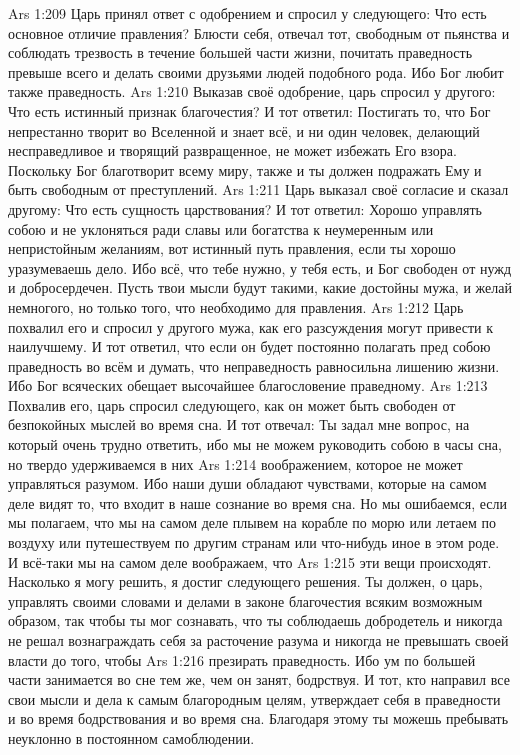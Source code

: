 \vs Ars 1:209
Царь принял ответ с одобрением и спросил у следующего: Что есть основное отличие правления? Блюсти себя, отвечал тот, свободным от пьянства и соблюдать трезвость в течение большей части жизни, почитать праведность превыше всего и делать своими друзьями людей подобного рода. Ибо Бог любит также праведность.
\vs Ars 1:210
Выказав своё одобрение, царь спросил у другого: Что есть истинный признак благочестия? И тот ответил: Постигать то, что Бог непрестанно творит во Вселенной и знает всё, и ни один человек, делающий несправедливое и творящий развращенное, не может избежать Его взора. Поскольку Бог благотворит всему миру, также и ты должен подражать Ему и быть свободным от преступлений.
\vs Ars 1:211
Царь выказал своё согласие и сказал другому: Что есть сущность царствования? И тот ответил: Хорошо управлять собою и не уклоняться ради славы или богатства к неумеренным или непристойным желаниям, вот истинный путь правления, если ты хорошо уразумеваешь дело. Ибо всё, что тебе нужно, у тебя есть, и Бог свободен от нужд и добросердечен. Пусть твои мысли будут такими, какие достойны мужа, и желай немногого, но только того, что необходимо для правления.
\vs Ars 1:212
Царь похвалил его и спросил у другого мужа, как его разсуждения могут привести к наилучшему. И тот ответил, что если он будет постоянно полагать пред собою праведность во всём и думать, что неправедность равносильна лишению жизни. Ибо Бог всяческих обещает высочайшее благословение праведному.
\vs Ars 1:213
Похвалив его, царь спросил следующего, как он может быть свободен от безпокойных мыслей во время сна. И тот отвечал: Ты задал мне вопрос, на который очень трудно ответить, ибо мы не можем руководить собою в часы сна, но твердо удерживаемся в них
\vs Ars 1:214
воображением, которое не может управляться разумом. Ибо наши души обладают чувствами, которые на самом деле видят то, что входит в наше сознание во время сна. Но мы ошибаемся, если мы полагаем, что мы на самом деле плывем на корабле по морю или летаем по воздуху или путешествуем по другим странам или что-нибудь иное в этом роде. И всё-таки мы на самом деле воображаем, что
\vs Ars 1:215
эти вещи происходят. Насколько я могу решить, я достиг следующего решения. Ты должен, о царь, управлять своими словами и делами в законе благочестия всяким возможным образом, так чтобы ты мог сознавать, что ты соблюдаешь добродетель и никогда не решал вознаграждать себя за расточение разума и никогда не превышать своей власти до того, чтобы
\vs Ars 1:216
презирать праведность. Ибо ум по большей части занимается во сне тем же, чем он занят, бодрствуя. И тот, кто направил все свои мысли и дела к самым благородным целям, утверждает себя в праведности и во время бодрствования и во время сна. Благодаря этому ты можешь пребывать неуклонно в постоянном самоблюдении.
